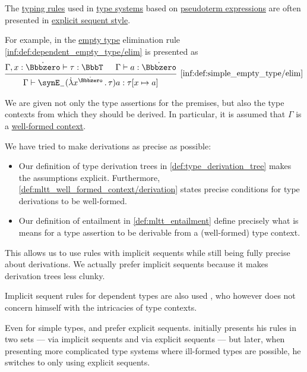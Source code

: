 \begin{remark}\label{rem:dependent_type_rule_sequents}
  The \hyperref[con:typing_rule]{typing rules} used in \hyperref[def:abstract_type_system]{type systems} based on \hyperref[con:pseudoterm_expression]{pseudoterm expressions} are often presented in \hyperref[rem:natural_deduction_explicit_sequents]{explicit sequent style}.

  For example, in \cite[\S A.2.7]{UnivalentFoundationsProgram2024OctoberHoTT} the \hyperref[def:dependent_empty_type]{empty type} elimination rule \ref{inf:def:dependent_empty_type/elim} is presented as
  \begin{equation*}
    \begin{prooftree}
      \hypo{ \Gamma, x: \syn\Bbbzero \vdash \tau: \BbbT }
      \hypo{ \Gamma \vdash a: \syn\Bbbzero }
      \infer2[\ref{inf:def:simple_empty_type/elim}]{ \Gamma \vdash \synE_- (\qabs {x^{\syn\Bbbzero}} \tau) a: \tau[x \mapsto a] }
    \end{prooftree}
  \end{equation*}

  We are given not only the type assertions for the premises, but also the type contexts from which they should be derived. In particular, it is assumed that \( \Gamma \) is a \hyperref[rem:well_formed_context]{well-formed context}.

  We have tried to make derivations as precise as possible:
  \begin{itemize}
    \item Our definition of type derivation trees in \cref{def:type_derivation_tree} makes the assumptions explicit. Furthermore, \cref{def:mltt_well_formed_context/derivation} states precise conditions for type derivations to be well-formed.

    \item Our definition of entailment in \cref{def:mltt_entailment} define precisely what is means for a type assertion to be derivable from a (well-formed) type context.
  \end{itemize}

  This allows us to use rules with implicit sequents while still being fully precise about derivations. We actually prefer implicit sequents because it makes derivation trees less clunky.
\end{remark}
\begin{comments}
  \item Implicit sequent rules for dependent types are also used , who however does not concern himself with the intricacies of type contexts.

  \item Even for simple types,  and  prefer explicit sequents.  initially presents his rules in two sets --- via implicit sequents and via explicit sequents --- but later, when presenting more complicated type systems where ill-formed types are possible, he switches to only using explicit sequents.
\end{comments}

